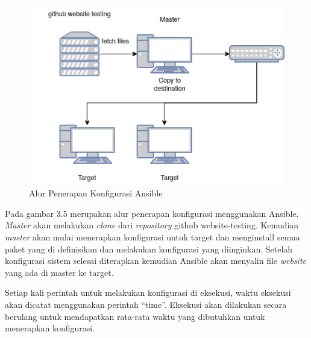 \documentclass[10pt,]{report}
\begin{document}
\begin{adjustwidth}{7mm}{}
	\begin{figure}[H]
		\centering
		\includegraphics[width=\textwidth]{images/Topologi-Ansible.png}
		\caption{Alur Penerapan Konfigurasi Ansible}
	\end{figure}
	Pada gambar 3.5 merupakan alur penerapan konfigurasi menggunakan Ansible.
	\textit{Master} akan melakukan \textit{clone} dari \textit{repository} github
	website-testing. Kemudian \textit{master} akan mulai menerapkan konfigurasi
	untuk target dan menginstall semua paket yang di definisikan dan melakukan
	konfigurasi yang diinginkan. Setelah konfigurasi sistem selesai diterapkan
	kemudian Ansible akan menyalin file \textit{website} yang ada di master ke
	target.

	Setiap kali perintah untuk melakukan konfigurasi di eksekusi, waktu eksekusi
	akan dicatat menggunakan perintah “time”. Eksekusi akan dilakukan secara
	berulang untuk mendapatkan rata-rata waktu yang dibutuhkan untuk menerapkan
	konfigurasi.\\
\end{adjustwidth}
\end{document}

